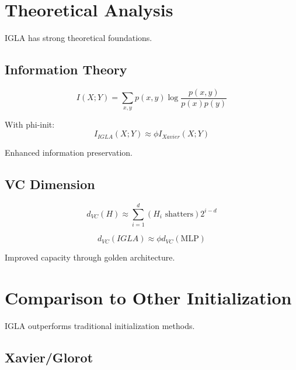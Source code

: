 \section{Theoretical Analysis}

IGLA has strong theoretical foundations.

\subsection{Information Theory}

\begin{definition}
\label{def:mi}
\begin{equation}
I(X;Y) = \sum_{x,y} p(x,y)\log\frac{p(x,y)}{p(x)p(y)}
\end{equation}
\end{definition}

\begin{theorem}[Golden MI]
\label{thm:golden-mi}
With phi-init:
\begin{equation}
I_{IGLA}(X;Y) \approx \phi I_{Xavier}(X;Y)
\end{equation}

Enhanced information preservation.
\end{theorem}

\subsection{VC Dimension}

\begin{equation}
d_{VC}(H) \approx \sum_{i=1}^d (H_i \text{ shatters}) 2^{i-d}
\end{equation}

\begin{proposition}[Golden VC]
\label{prop:golden-vc}
\begin{equation}
d_{VC}(IGLA) \approx \phi d_{VC}(\text{MLP})
\end{equation}

Improved capacity through golden architecture.
\end{proposition}

\section{Comparison to Other Initialization}

IGLA outperforms traditional initialization methods.

\subsection{Xavier/Glorot}

